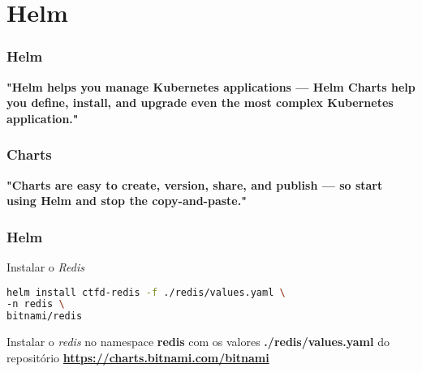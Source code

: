 \section{Helm}

\begin{frame}
\frametitle{Helm}
\begin{center}
\textbf{"Helm helps you manage Kubernetes applications — Helm Charts help you define, install, and upgrade even the most complex Kubernetes application."} \cite{Helm}
\begin{itemize}
\end{itemize}
\end{center}
\end{frame}

\begin{frame}
\frametitle{Charts}
\begin{center}
\textbf{"Charts are easy to create, version, share, and publish — so start using Helm and stop the copy-and-paste."} \cite{Helm}
\begin{itemize}
\end{itemize}
\end{center}
\end{frame}

\begin{frame}[containsverbatim]
\frametitle{Helm}
\begin{center}
\begin{minipage}{0.9\textwidth}
\begin{block}{Instalar o \textit{Redis}}
\begin{lstlisting}[language=bash]
helm install ctfd-redis -f ./redis/values.yaml \
-n redis \
bitnami/redis
\end{lstlisting}
\end{block}
\end{minipage}
\end{center}
Instalar o \textit{redis} no namespace \textbf{redis} com os valores \textbf{./redis/values.yaml} do repositório \textbf{\url{https://charts.bitnami.com/bitnami}}
\end{frame}

